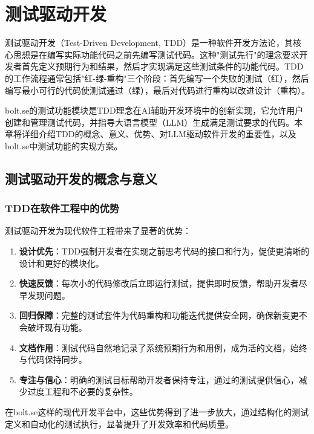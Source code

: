 
\chapter{测试驱动开发}

测试驱动开发（Test-Driven Development, TDD）是一种软件开发方法论，其核心思想是在编写实际功能代码之前先编写测试代码。这种"测试先行"的理念要求开发者首先定义预期行为和结果，然后才实现满足这些测试条件的功能代码。TDD的工作流程通常包括"红-绿-重构"三个阶段：首先编写一个失败的测试（红），然后编写最小可行的代码使测试通过（绿），最后对代码进行重构以改进设计（重构）\cite{Beck2002}。

bolt.se的测试功能模块是TDD理念在AI辅助开发环境中的创新实现，它允许用户创建和管理测试代码，并指导大语言模型（LLM）生成满足测试要求的代码。本章将详细介绍TDD的概念、意义、优势、对LLM驱动软件开发的重要性，以及bolt.se中测试功能的实现方案。

\section{测试驱动开发的概念与意义}

\subsection{TDD在软件工程中的优势}
测试驱动开发为现代软件工程带来了显著的优势：

\begin{enumerate}
  \item \textbf{设计优先}：TDD强制开发者在实现之前思考代码的接口和行为，促使更清晰的设计和更好的模块化。
  
  \item \textbf{快速反馈}：每次小的代码修改后立即运行测试，提供即时反馈，帮助开发者尽早发现问题。
  
  \item \textbf{回归保障}：完整的测试套件为代码重构和功能迭代提供安全网，确保新变更不会破坏现有功能。
  
  \item \textbf{文档作用}：测试代码自然地记录了系统预期行为和用例，成为活的文档，始终与代码保持同步。
  
  \item \textbf{专注与信心}：明确的测试目标帮助开发者保持专注，通过的测试提供信心，减少过度工程和不必要的复杂性。
\end{enumerate}

在bolt.se这样的现代开发平台中，这些优势得到了进一步放大，通过结构化的测试定义和自动化的测试执行，显著提升了开发效率和代码质量。

